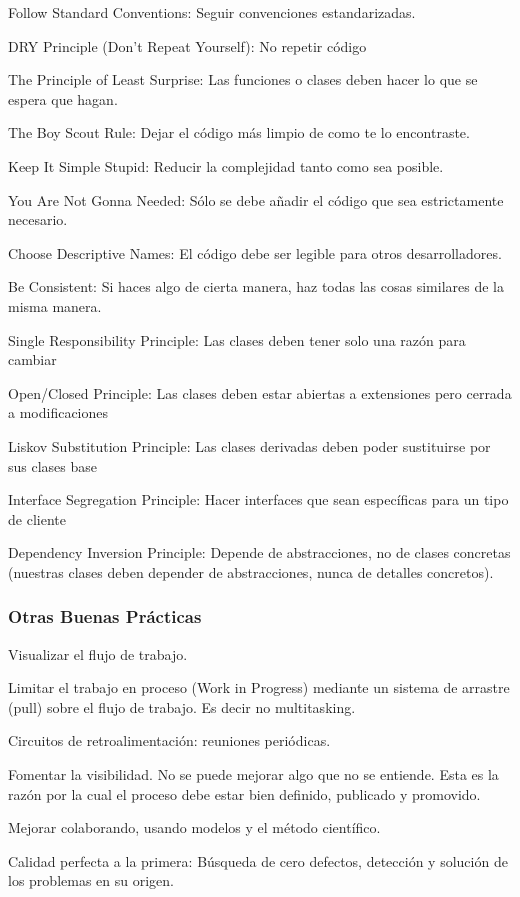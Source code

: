 \documentclass[12pt,twoside,titlepage]{report}
\begin{document}
\begin{compactitem}
    \item Follow Standard Conventions: Seguir convenciones estandarizadas.
    \item DRY Principle (Don't Repeat Yourself): No repetir código
    \item The Principle of Least Surprise: Las funciones o clases deben hacer lo que se espera que hagan.
    \item The Boy Scout Rule: Dejar el código más limpio de como te lo encontraste.
    \item Keep It Simple Stupid: Reducir la complejidad tanto como sea posible.
    \item You Are Not Gonna Needed: Sólo se debe añadir el código que sea estrictamente necesario.
    \item Choose Descriptive Names: El código debe ser legible para otros desarrolladores.
    \item Be Consistent: Si haces algo de cierta manera, haz todas las cosas similares de la misma manera.
    \item Single Responsibility Principle: Las clases deben tener solo una razón para cambiar
    \item Open/Closed Principle: Las clases deben estar abiertas a extensiones pero cerrada a modificaciones
    \item Liskov Substitution Principle: Las clases derivadas deben poder sustituirse por sus clases base
    \item Interface Segregation Principle: Hacer interfaces que sean específicas para un tipo de cliente
    \item Dependency Inversion Principle: Depende de abstracciones, no de clases concretas (nuestras clases deben depender de abstracciones, nunca de detalles concretos).
\end{compactitem}

\subsubsection{Otras Buenas Prácticas}

\begin{compactitem}
    \item Visualizar el flujo de trabajo.
    \item Limitar el trabajo en proceso (Work in Progress) mediante un sistema de arrastre (pull) sobre el flujo de trabajo. Es decir no multitasking.
    \item Circuitos de retroalimentación: reuniones periódicas.
    \item Fomentar la visibilidad. No se puede mejorar algo que no se entiende. Esta es la razón por la cual el proceso debe estar bien definido, publicado y promovido.
    \item Mejorar colaborando, usando modelos y el método científico.
    \item Calidad perfecta a la primera: Búsqueda de cero defectos, detección y solución de los problemas en su origen.
\end{compactitem}
\end{document}
